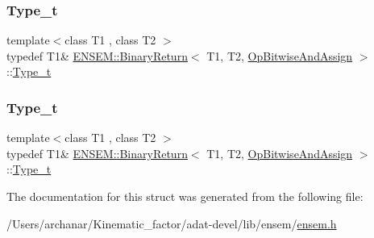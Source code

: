 \mbox{\label{structENSEM_1_1BinaryReturn_3_01T1_00_01T2_00_01OpBitwiseAndAssign_01_4_a89c578dd7fb24880911d984649901627}} 
\subsubsection{\texorpdfstring{Type\_t}{Type\_t}\hspace{0.1cm}{\footnotesize\ttfamily [2/3]}}
{\footnotesize\ttfamily template$<$class T1 , class T2 $>$ \\
typedef T1\& \mbox{\hyperlink{structENSEM_1_1BinaryReturn}{E\+N\+S\+E\+M\+::\+Binary\+Return}}$<$ T1, T2, \mbox{\hyperlink{structENSEM_1_1OpBitwiseAndAssign}{Op\+Bitwise\+And\+Assign}} $>$\+::\mbox{\hyperlink{structENSEM_1_1BinaryReturn_3_01T1_00_01T2_00_01OpBitwiseAndAssign_01_4_a89c578dd7fb24880911d984649901627}{Type\+\_\+t}}}

\mbox{\label{structENSEM_1_1BinaryReturn_3_01T1_00_01T2_00_01OpBitwiseAndAssign_01_4_a89c578dd7fb24880911d984649901627}} 
\subsubsection{\texorpdfstring{Type\_t}{Type\_t}\hspace{0.1cm}{\footnotesize\ttfamily [3/3]}}
{\footnotesize\ttfamily template$<$class T1 , class T2 $>$ \\
typedef T1\& \mbox{\hyperlink{structENSEM_1_1BinaryReturn}{E\+N\+S\+E\+M\+::\+Binary\+Return}}$<$ T1, T2, \mbox{\hyperlink{structENSEM_1_1OpBitwiseAndAssign}{Op\+Bitwise\+And\+Assign}} $>$\+::\mbox{\hyperlink{structENSEM_1_1BinaryReturn_3_01T1_00_01T2_00_01OpBitwiseAndAssign_01_4_a89c578dd7fb24880911d984649901627}{Type\+\_\+t}}}



The documentation for this struct was generated from the following file\+:\begin{DoxyCompactItemize}
\item 
/\+Users/archanar/\+Kinematic\+\_\+factor/adat-\/devel/lib/ensem/\mbox{\hyperlink{adat-devel_2lib_2ensem_2ensem_8h}{ensem.\+h}}\end{DoxyCompactItemize}
